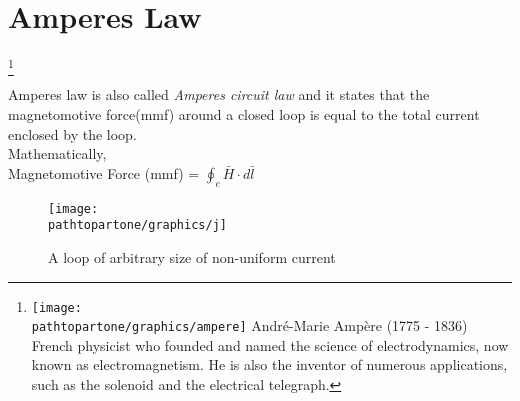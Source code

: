 \section{Amperes Law}
\footnote[9]{
\texttt{[image: \\pathtopartone/graphics/ampere]} 
André-Marie Ampère (1775 - 1836) French physicist who founded and named the science of electrodynamics, now known as electromagnetism. He is also the inventor of numerous applications, such as the solenoid and the electrical telegraph.
}

Amperes law is also called \emph{Amperes circuit law} and it states that the magnetomotive force(mmf) around a closed loop is equal to the total current enclosed by the loop.\\
Mathematically, \\
Magnetomotive Force (mmf) = $\oint_c \bar{H} \cdot d\bar{l}$ \\
\begin{figure}[h]
	\centering
	\texttt{[image: \\pathtopartone/graphics/j]}
	\caption{A loop of arbitrary size of non-uniform current}
	\label{fig:j}
\end{figure}

